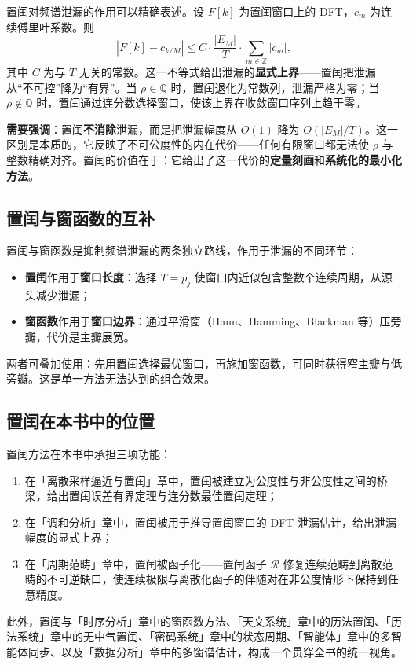 置闰对频谱泄漏的作用可以精确表述。设 $F[k]$ 为置闰窗口上的 DFT，$c_m$ 为连续傅里叶系数。则
\[
\left| F[k] - c_{k/M} \right| \le C \cdot \frac{|E_M|}{T} \cdot \sum_{m\in\mathbb{Z}} |c_m|,
\]
其中 $C$ 为与 $T$ 无关的常数。这一不等式给出泄漏的\textbf{显式上界}——置闰把泄漏从“不可控”降为“有界”。当 $\rho \in \mathbb{Q}$ 时，置闰退化为常数列，泄漏严格为零；当 $\rho \notin \mathbb{Q}$ 时，置闰通过连分数选择窗口，使该上界在收敛窗口序列上趋于零。

\textbf{需要强调}：置闰\textbf{不消除}泄漏，而是把泄漏幅度从 $O(1)$ 降为 $O(|E_M|/T)$。这一区别是本质的，它反映了不可公度性的内在代价——任何有限窗口都无法使 $\rho$ 与整数精确对齐。置闰的价值在于：它给出了这一代价的\textbf{定量刻画}和\textbf{系统化的最小化方法}。

\subsection*{置闰与窗函数的互补}

置闰与窗函数是抑制频谱泄漏的两条独立路线，作用于泄漏的不同环节：
\begin{itemize}[leftmargin=2em]
    \item \textbf{置闰}作用于\textbf{窗口长度}：选择 $T = p_j$ 使窗口内近似包含整数个连续周期，从源头减少泄漏；
    \item \textbf{窗函数}作用于\textbf{窗口边界}：通过平滑窗（Hann、Hamming、Blackman 等）压旁瓣，代价是主瓣展宽。
\end{itemize}
两者可叠加使用：先用置闰选择最优窗口，再施加窗函数，可同时获得窄主瓣与低旁瓣。这是单一方法无法达到的组合效果。

\subsection*{置闰在本书中的位置}

置闰方法在本书中承担三项功能：
\begin{enumerate}[leftmargin=2em, label={(\arabic*)}]
    \item 在「离散采样逼近与置闰」章中，置闰被建立为公度性与非公度性之间的桥梁，给出置闰误差有界定理与连分数最佳置闰定理；
    \item 在「调和分析」章中，置闰被用于推导置闰窗口的 DFT 泄漏估计，给出泄漏幅度的显式上界；
    \item 在「周期范畴」章中，置闰被函子化——置闰函子 $\mathcal{R}$ 修复连续范畴到离散范畴的不可逆缺口，使连续极限与离散化函子的伴随对在非公度情形下保持到任意精度。
\end{enumerate}
此外，置闰与「时序分析」章中的窗函数方法、「天文系统」章中的历法置闰、「历法系统」章中的无中气置闰、「密码系统」章中的状态周期、「智能体」章中的多智能体同步、以及「数据分析」章中的多窗谱估计，构成一个贯穿全书的统一视角。

